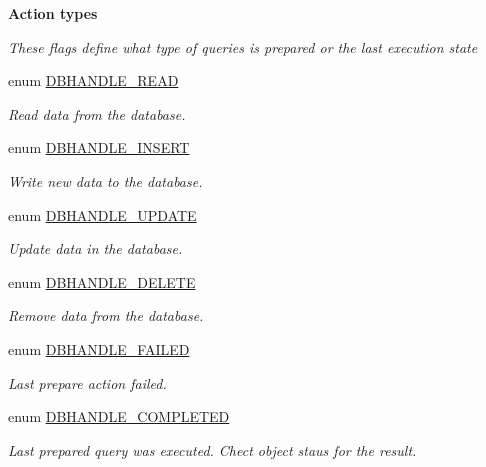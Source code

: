 \begin{Indent}{\bf Action types}\par
{\em \label{_amgrp9ad7eef834aba9bf8b8f74b3a7b87e62}
 These flags define what type of queries is prepared or the last execution state }\begin{DoxyCompactItemize}
\item 
enum \hyperlink{class_8dbhandler_8php_a4dbfa42638414eb755b9e798ba993573}{DBHANDLE\_\-READ} 
\begin{DoxyCompactList}\small\item\em Read data from the database. \item\end{DoxyCompactList}\item 
enum \hyperlink{class_8dbhandler_8php_a9b823a1d51ed910255c944dfe313129a}{DBHANDLE\_\-INSERT} 
\begin{DoxyCompactList}\small\item\em Write new data to the database. \item\end{DoxyCompactList}\item 
enum \hyperlink{class_8dbhandler_8php_a44c5292f8bc0072b38e9651b63cc04d8}{DBHANDLE\_\-UPDATE} 
\begin{DoxyCompactList}\small\item\em Update data in the database. \item\end{DoxyCompactList}\item 
enum \hyperlink{class_8dbhandler_8php_a978ad3c1b4647dae1fe77c7f8c757da5}{DBHANDLE\_\-DELETE} 
\begin{DoxyCompactList}\small\item\em Remove data from the database. \item\end{DoxyCompactList}\item 
enum \hyperlink{class_8dbhandler_8php_acf3fd82991e7c67a3472b81dc1ce9904}{DBHANDLE\_\-FAILED} 
\begin{DoxyCompactList}\small\item\em Last prepare action failed. \item\end{DoxyCompactList}\item 
enum \hyperlink{class_8dbhandler_8php_a81abd823ff43027e2a788e4d5993790f}{DBHANDLE\_\-COMPLETED} 
\begin{DoxyCompactList}\small\item\em Last prepared query was executed. Chect object staus for the result. \item\end{DoxyCompactList}\end{DoxyCompactItemize}
\end{Indent}


